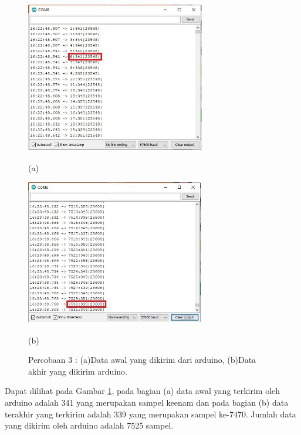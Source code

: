 \begin{figure}[H] \centering
	\includegraphics[width=0.7\textwidth]{img/percob/Slide5}
	
	(a)
	
	\includegraphics[width=0.7\textwidth]{img/percob/Slide6}
		
	(b)
	
	\caption{Percobaan 3 : (a)Data awal yang dikirim dari arduino, (b)Data akhir yang dikirim arduino.}
	\label{fig:4.2.3}
\end{figure}
\vspace{1ex}
Dapat dilihat pada Gambar \ref{fig:4.2.3}, pada bagian (a) data awal yang terkirim oleh arduino adalah 341 yang merupakan sampel keenam dan pada bagian (b) data terakhir yang terkirim adalah 339 yang merupakan sampel ke-7470. Jumlah data yang dikirim oleh arduino adalah 7525 sampel.

